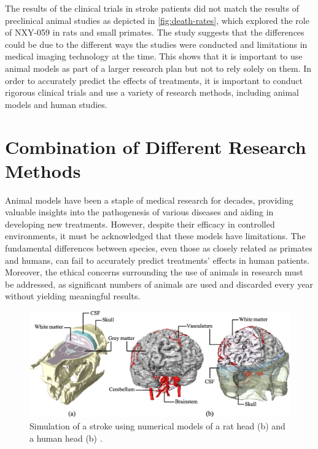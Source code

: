 \documentclass[10pt]{article}
\begin{document}
\begin{sloppypar}
  The results of the clinical trials in stroke patients did not match the results of preclinical animal studies as depicted in \autoref{fig:death-rates}, which explored the role of NXY-059 in rats and small primates. The study suggests that the differences could be due to the different ways the studies were conducted and limitations in medical imaging technology at the time. This shows that it is important to use animal models as part of a larger research plan but not to rely solely on them. In order to accurately predict the effects of treatments, it is important to conduct rigorous clinical trials and use a variety of research methods, including animal models and human studies.

  \section{Combination of Different Research Methods}
  \label{sec:discussion}

  Animal models have been a staple of medical research for decades, providing valuable insights into the pathogenesis of various diseases and aiding in developing new treatments. However, despite their efficacy in controlled environments, it must be acknowledged that these models have limitations. The fundamental differences between species, even those as closely related as primates and humans, can fail to accurately predict treatments’ effects in human patients. Moreover, the ethical concerns surrounding the use of animals in research must be addressed, as significant numbers of animals are used and discarded every year without yielding meaningful results.

  \vspace{10pt} %
  \begin{figure}[ht]
    \centering
    \includegraphics[width=\textwidth]{figures/in-silico.jpg}
    \caption[Simulation of a stroke using numerical models of a rat head and a human head]{Simulation of a stroke using numerical models of a rat head (b) and a human head (b) \citep{bing_medical_2020}.}
    \label{fig:silico}
  \end{figure}


\end{sloppypar}
\end{document}
